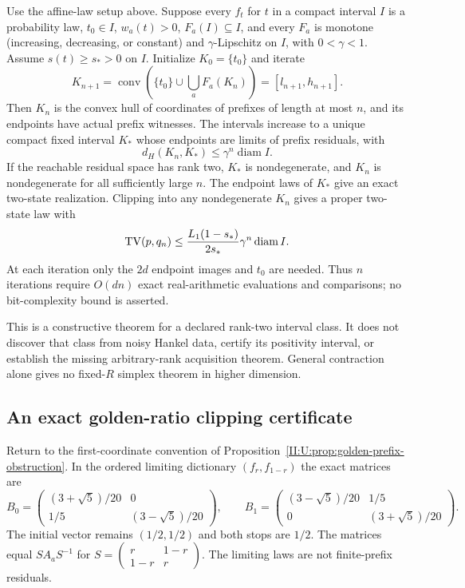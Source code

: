 \begin{theorem}
\label{II:U:thm:rank-two-envelope}
Use the affine-law setup above. Suppose every $f_t$ for $t$ in a
compact interval $I$ is a probability law, $t_0\in I$,
$w_a(t)>0$, $F_a(I)\subseteq I$, and every $F_a$ is monotone
(increasing, decreasing, or constant) and $\gamma$-Lipschitz on $I$,
with $0<\gamma<1$. Assume $s(t)\ge s_*>0$ on $I$.
Initialize $K_0=\{t_0\}$ and iterate
\begin{equation}
 K_{n+1}=\operatorname{conv}
   \left(\{t_0\}\cup\bigcup_a F_a(K_n)\right)
       =[l_{n+1},h_{n+1}].
 \label{II:U:eq:rank-two-envelope}
\end{equation}
Then $K_n$ is the convex hull of coordinates of prefixes of length
at most $n$, and its endpoints have actual prefix witnesses.
The intervals increase to a unique compact fixed interval $K_*$
whose endpoints are limits of prefix residuals, with
\[
 d_H(K_n,K_*)\le\gamma^n\operatorname{diam}I.
\]
If the reachable residual space has rank two, $K_*$ is nondegenerate,
and $K_n$ is nondegenerate for all sufficiently large $n$.
The endpoint laws of $K_*$ give an exact two-state realization.
Clipping into any nondegenerate $K_n$ gives a proper two-state law with
\[
 \operatorname{TV}(p,q_n)\le
 \frac{L_1(1-s_*)}{2s_*}\gamma^n\operatorname{diam}I.
\]
At each iteration only the $2d$ endpoint images and $t_0$ are needed.
Thus $n$ iterations require $O(dn)$ exact real-arithmetic evaluations
and comparisons; no bit-complexity bound is asserted.
\end{theorem}

This is a constructive theorem for a declared rank-two interval class.
It does not discover that class from noisy Hankel data, certify its
positivity interval, or establish the missing arbitrary-rank acquisition
theorem. General contraction alone gives no fixed-$R$ simplex theorem
in higher dimension.

\subsection{An exact golden-ratio clipping certificate}
\label{II:U:sec:golden-constructive}
Return to the first-coordinate convention of
Proposition~\ref{II:U:prop:golden-prefix-obstruction}. In the ordered
limiting dictionary $(f_r,f_{1-r})$ the exact matrices are
\[
 B_0=\begin{pmatrix}(3+\sqrt5)/20&0\\1/5&(3-\sqrt5)/20\end{pmatrix},
 \qquad
 B_1=\begin{pmatrix}(3-\sqrt5)/20&1/5\\0&(3+\sqrt5)/20\end{pmatrix}.
\]
The initial vector remains $(1/2,1/2)$ and both stops are $1/2$.
The matrices equal $SA_aS^{-1}$ for
$S=\left(\begin{smallmatrix}r&1-r\\1-r&r\end{smallmatrix}\right)$.
The limiting laws are not finite-prefix residuals.

